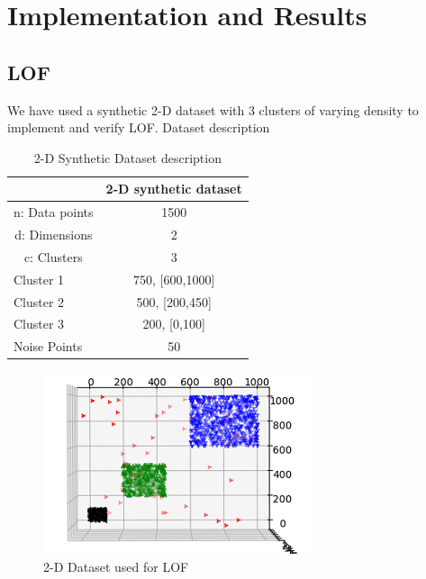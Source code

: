 \chapter{Implementation and Results}\label{Implementation and Results}

\section{LOF}
We have used a synthetic 2-D dataset with 3 clusters of varying density to implement and verify LOF.
Dataset description\\
\begin{table}[H]
	\centering
	\caption{2-D Synthetic Dataset description}
	\label{my-label}
	\begin{tabular}{|l|l|}
		\hline
		& \multicolumn{1}{c|}{2-D synthetic dataset} \\ \hline
		\multicolumn{1}{|c|}{n: Data points} & \multicolumn{1}{c|}{1500}                  \\ \hline
		
		\multicolumn{1}{|c|}{d: Dimensions}  & \multicolumn{1}{c|}{2}                     \\ \hline
		\multicolumn{1}{|c|}{c: Clusters}  & \multicolumn{1}{c|}{3}                     \\ \hline
		
		
		
		Cluster 1                            & \multicolumn{1}{c|}{750, {[}600,1000{]}}                        \\ \hline
	
		Cluster 2                            &  \multicolumn{1}{c|}{500, {[}200,450{]}}                           \\ \hline
		
		Cluster 3                            & \multicolumn{1}{c|}{200, {[}0,100{]}}                           \\ \hline
		Noise Points                         & \multicolumn{1}{c|}{50}                                         \\ \hline
	\end{tabular}
\end{table}

\begin{figure}[h!]
	\centering
	\includegraphics{chap04/LOF_dataset.png}
	\caption{2-D Dataset used for LOF}
\end{figure}

